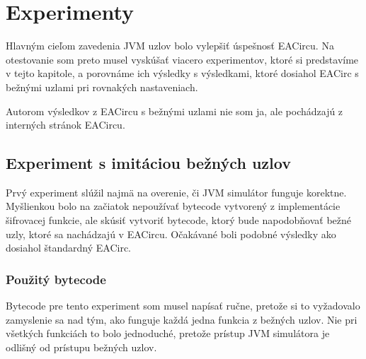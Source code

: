 \chapter{Experimenty}
\label{chap:experiments}

Hlavným cieľom zavedenia JVM uzlov bolo vylepšiť úspešnosť EACircu. Na otestovanie som preto musel vyskúšať viacero experimentov, ktoré si predstavíme v tejto kapitole, a porovnáme ich výsledky s výsledkami, ktoré dosiahol EACirc s bežnými uzlami pri rovnakých nastaveniach. 

Autorom výsledkov z EACircu s bežnými uzlami nie som ja, ale pochádzajú z interných stránok EACircu. 

\section{Experiment s imitáciou bežných uzlov}
\label{sec:exp1}

Prvý experiment slúžil najmä na overenie, či JVM simulátor funguje korektne. Myšlienkou bolo na začiatok nepoužívať bytecode vytvorený z implementácie šifrovacej funkcie, ale skúsiť vytvoriť bytecode, ktorý bude napodobňovať bežné uzly, ktoré sa nachádzajú v EACircu. Očakávané boli podobné výsledky ako dosiahol štandardný EACirc.

\subsection{Použitý bytecode}
\label{subsec:exp1-bytecode}

Bytecode pre tento experiment som musel napísať ručne, pretože si to vyžadovalo zamyslenie sa nad tým, ako funguje každá jedna funkcia z bežných uzlov. Nie pri všetkých funkciách to bolo jednoduché, pretože prístup JVM simulátora je odlišný od prístupu bežných uzlov. 

